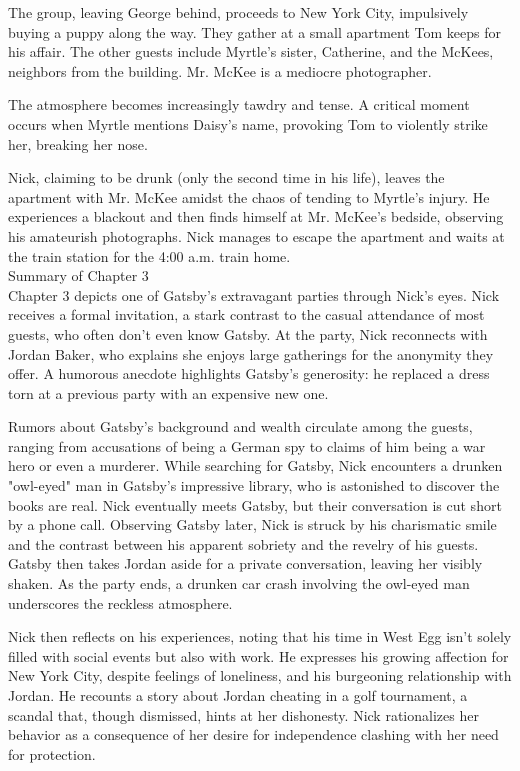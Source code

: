 \begin{tcolorbox}[title = {History}, breakable]
The group, leaving George behind, proceeds to New York City, impulsively buying a puppy along the way.  They gather at a small apartment Tom keeps for his affair.  The other guests include Myrtle's sister, Catherine, and the McKees, neighbors from the building. Mr. McKee is a mediocre photographer.

The atmosphere becomes increasingly tawdry and tense.  A critical moment occurs when Myrtle mentions Daisy's name, provoking Tom to violently strike her, breaking her nose.

Nick, claiming to be drunk (only the second time in his life), leaves the apartment with Mr. McKee amidst the chaos of tending to Myrtle's injury.  He experiences a blackout and then finds himself at Mr. McKee's bedside, observing his amateurish photographs.  Nick manages to escape the apartment and waits at the train station for the 4:00 a.m. train home.
\\Summary of Chapter 3 \\
Chapter 3 depicts one of Gatsby's extravagant parties through Nick's eyes.  Nick receives a formal invitation, a stark contrast to the casual attendance of most guests, who often don't even know Gatsby.  At the party, Nick reconnects with Jordan Baker, who explains she enjoys large gatherings for the anonymity they offer.  A humorous anecdote highlights Gatsby's generosity: he replaced a dress torn at a previous party with an expensive new one.

Rumors about Gatsby's background and wealth circulate among the guests, ranging from accusations of being a German spy to claims of him being a war hero or even a murderer.  While searching for Gatsby, Nick encounters a drunken "owl-eyed" man in Gatsby's impressive library, who is astonished to discover the books are real.  Nick eventually meets Gatsby, but their conversation is cut short by a phone call.  Observing Gatsby later, Nick is struck by his charismatic smile and the contrast between his apparent sobriety and the revelry of his guests.  Gatsby then takes Jordan aside for a private conversation, leaving her visibly shaken.  As the party ends, a drunken car crash involving the owl-eyed man underscores the reckless atmosphere.

Nick then reflects on his experiences, noting that his time in West Egg isn't solely filled with social events but also with work.  He expresses his growing affection for New York City, despite feelings of loneliness, and his burgeoning relationship with Jordan.  He recounts a story about Jordan cheating in a golf tournament, a scandal that, though dismissed, hints at her dishonesty.  Nick rationalizes her behavior as a consequence of her desire for independence clashing with her need for protection.


\end{tcolorbox}
